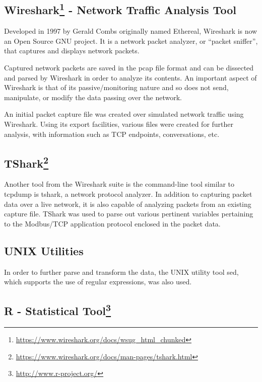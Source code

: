 \documentclass[]{article}
\let\rmarkdownfootnote\footnote%
\def\footnote{\protect\rmarkdownfootnote}
\begin{document}
\subsection[Wireshark - Network Traffic Analysis
Tool]{Wireshark\footnote{\url{https://www.wireshark.org/docs/wsug_html_chunked}}
- Network Traffic Analysis
Tool}\label{wireshark1---network-traffic-analysis-tool}

Developed in 1997 by Gerald Combs originally named Ethereal, Wireshark
is now an Open Source GNU project. It is a network packet analyzer, or
``packet sniffer'', that captures and displays network packets.

Captured network packets are saved in the pcap file format and can be
dissected and parsed by Wireshark in order to analyze its contents. An
important aspect of Wireshark is that of its passive/monitoring nature
and so does not send, manipulate, or modify the data passing over the
network.

An initial packet capture file was created over simulated network
traffic using Wireshark. Using its export facilities, various files were
created for further analysis, with information such as TCP endpoints,
conversations, etc.

\subsection[TShark]{TShark\footnote{\url{https://www.wireshark.org/docs/man-pages/tshark.html}}}\label{tshark2}

Another tool from the Wireshark suite is the command-line tool similar
to tcpdump is tshark, a network protocol analyzer. In addition to
capturing packet data over a live network, it is also capable of
analyzing packets from an existing capture file. TShark was used to
parse out various pertinent variables pertaining to the Modbus/TCP
application protocol enclosed in the packet data.

\subsection{UNIX Utilities}\label{unix-utilities}

In order to further parse and transform the data, the UNIX utility tool
sed, which supports the use of regular expressions, was also used.

\subsection[R - Statistical Tool]{R - Statistical Tool\footnote{\url{http://www.r-project.org/}}}\label{r---statistical-tool3}
\end{document}
